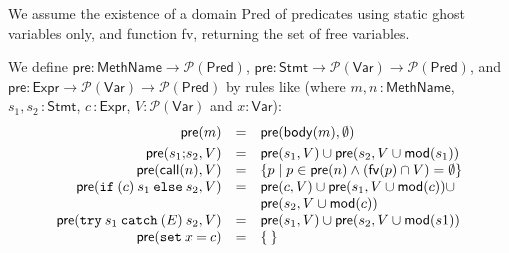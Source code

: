 We assume the existence of a domain \textsf{Pred} of predicates using
static ghost variables only, and function
\textsf{fv}, returning the set of free variables.

\begin{definition}
We define
\(\mathsf{pre} \colon \mathsf{MethName} \rightarrow
\mathcal{P}(\mathsf{Pred})\),
\( \mathsf{pre}  \colon  \mathsf{Stmt} \rightarrow
\mathcal{P}(\mathsf{Var}) \rightarrow \mathcal{P}(\mathsf{Pred}) \), and
\( \mathsf{pre}  \colon  \mathsf{Expr} \rightarrow
\mathcal{P}(\mathsf{Var}) \rightarrow \mathcal{P}(\mathsf{Pred}) \)
by rules like (where \(m,n\,\colon\mathsf{MethName}\),
\(s_1,s_2\,\colon\mathsf{Stmt}\), \(c\,\colon\mathsf{Expr}\),
\(V\colon\mathcal{P}(\mathsf{Var})\) and \(x\colon\mathsf{Var}\)): 
\[
\begin{array}{rcl}
\mathsf{pre}(m) & = & \mathsf{pre}(\mathsf{body}(m), \emptyset) \smallskip\\
\mathsf{pre}(s_1 \mathtt{;} s_2, V) & = & \mathsf{pre}(s_1, V) \cup 
                                          \mathsf{pre}(s_2, V \cup \mathsf{mod}(s_1))\\

\mathsf{pre}(\mathsf{call}(n),V) & = & 
                \{ p \mid p \in \mathsf{pre}(n) \wedge 
                          (\mathsf{fv}(p) \cap V) = \emptyset\}\\
\mathsf{pre}(\mathtt{if\:(} c \mathtt{)\:} s_1 \mathtt{\:else\:} s_2, V) & = &
   \mathsf{pre}(c, V) \cup 
   \mathsf{pre}(s_1, V \cup \mathsf{mod}(c)) \cup\\
&&   \mathsf{pre}(s_2, V \cup \mathsf{mod}(c))\\
\mathsf{pre}(\mathtt{try\:} s_1 \mathtt{\:catch\:(} E \mathtt{)\:} s_2, V) & = & 
   \mathsf{pre}(s_1, V) \cup 
   \mathsf{pre}(s_2, V \cup \mathsf{mod}(s1))\\
\mathsf{pre}( \mathtt{set\:} x \mathtt{\:=\:} c) & = & \{\: \}
\end{array}
\]
\end{definition}


